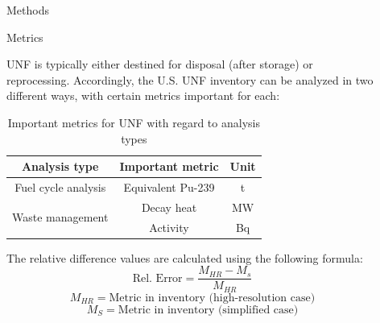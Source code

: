 \documentclass[final]{beamer}
\newlength{\sepwid}
\newlength{\onecolwid}
\newlength{\threecolwid}
\begin{document}
\begin{frame}[t]
\begin{columns}[t,totalwidth=\threecolwid]
\begin{column}{\onecolwid}
\begin{block}{Methods}
\end{block}

\begin{block}{Metrics}

\gls{UNF} is typically either destined for disposal (after storage) or reprocessing.
Accordingly, the U.S. \gls{UNF} inventory can be analyzed in two different
ways, with certain metrics important for each:

\begin{table}[h]
    \centering
    \begin{tabular}{ccc}
        \hline
        Analysis type & Important metric & Unit\\
        \hline
        Fuel cycle analysis & Equivalent Pu-239 \cite{anon_plutonium_1989} & t \\
        \hline
        \multirow{2}{*}{Waste management} & Decay heat & MW\\
        & Activity & Bq \\
        \hline
    \end{tabular}
    \caption{Important metrics for \gls{UNF} with regard to analysis types }
    \label{tab:met}
\end{table}

The relative difference values are calculated using the following formula:
\[\text{Rel. Error} = \frac{M_{HR} - M_{s}}{M_{HR}}\]
\[M_{HR} = \text{Metric in inventory (high-resolution case)}\]
\[M_{S} = \text{Metric in inventory (simplified case)}\]

\end{block}


\end{column} %

\begin{column}{\sepwid}\end{column} %



\begin{column}{\onecolwid} %







\end{column}
\end{columns}
\end{frame}
\end{document}
